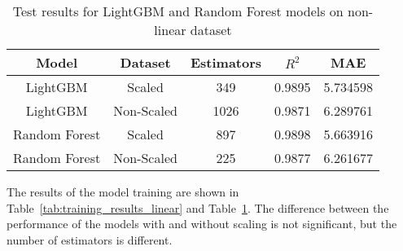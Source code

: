 \begin{table}
    \centering
    \caption{Test results for LightGBM and Random Forest models on non-linear dataset}
    \label{tab:training_results}

    \begin{tabular}{|c|c|c|c|c|}
        \hline
        Model         & Dataset    & Estimators & $R^2$  & MAE      \\
        \hline
        LightGBM      & Scaled     & 349        & 0.9895 & 5.734598 \\
        LightGBM      & Non-Scaled & 1026       & 0.9871 & 6.289761 \\
        Random Forest & Scaled     & 897        & 0.9898 & 5.663916 \\
        Random Forest & Non-Scaled & 225        & 0.9877 & 6.261677 \\
        \hline
    \end{tabular}
\end{table}

The results of the model training are shown in Table~\ref{tab:training_results_linear} and Table~\ref{tab:training_results}.
The difference between the performance of the models with and without scaling is not significant, but the number of estimators is different.
